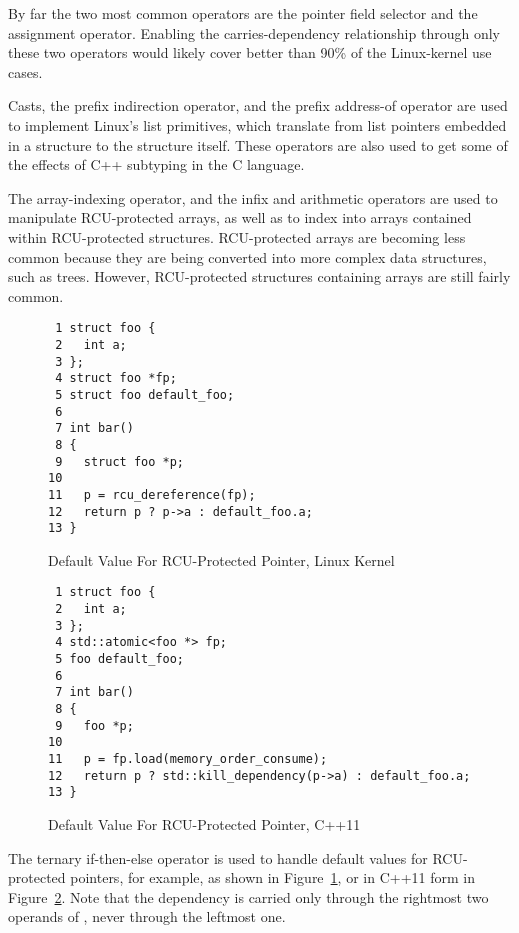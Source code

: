 \documentclass[letterpaper,twocolumn,10pt]{article}
\begin{document}
By far the two most common operators are the \co{->} pointer field selector
and the \co{=} assignment operator.
Enabling the carries-dependency relationship through only these two
operators would likely cover better than 90\% of the Linux-kernel use cases.

Casts, the prefix \co{*} indirection operator, and the prefix
\co{&} address-of operator are used to implement Linux's list
primitives, which translate from list pointers embedded in a
structure to the structure itself.
These operators are also used to get some of the effects of C++
subtyping in the C language.

The \co{[]} array-indexing operator, and the infix \co{+} and \co{-}
arithmetic operators are used to manipulate RCU-protected arrays,
as well as to index into arrays contained within RCU-protected structures.
RCU-protected arrays are becoming less common because they are being
converted into more complex data structures, such as trees.
However, RCU-protected structures containing arrays are still fairly common.

\begin{figure}[tbp]
{ \scriptsize
\begin{verbatim}
 1 struct foo {
 2   int a;
 3 };
 4 struct foo *fp;
 5 struct foo default_foo;
 6 
 7 int bar()
 8 {
 9   struct foo *p;
10 
11   p = rcu_dereference(fp);
12   return p ? p->a : default_foo.a;
13 }
\end{verbatim}
}
\caption{Default Value For RCU-Protected Pointer, Linux Kernel}
\label{fig:Default Value For RCU-Protected Pointer, Linux Kernel}
\end{figure}

\begin{figure}[tbp]
{ \scriptsize
\begin{verbatim}
 1 struct foo {
 2   int a;
 3 };
 4 std::atomic<foo *> fp;
 5 foo default_foo;
 6 
 7 int bar()
 8 {
 9   foo *p;
10 
11   p = fp.load(memory_order_consume);
12   return p ? std::kill_dependency(p->a) : default_foo.a;
13 }
\end{verbatim}
}
\caption{Default Value For RCU-Protected Pointer, C++11}
\label{fig:Default Value For RCU-Protected Pointer, C++11}
\end{figure}

The ternary  if-then-else operator is used to handle default
values for RCU-protected pointers, for example, as shown in
Figure~\ref{fig:Default Value For RCU-Protected Pointer, Linux Kernel},
or in C++11 form in
Figure~\ref{fig:Default Value For RCU-Protected Pointer, C++11}.
Note that the dependency is carried only through the rightmost two
operands of , never through the leftmost one.
\end{document}
